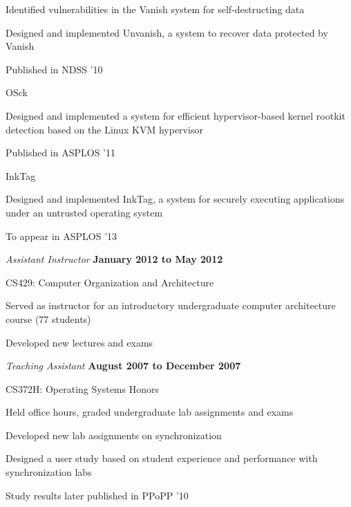 \documentclass[10pt]{article}
\newenvironment{outerlist}[1][\enskip\textbullet]%
        {\begin{itemize}[#1]}{\end{itemize}%
         \vspace{-.6\baselineskip}}
\newenvironment{innerlist}[1][\enskip\textbullet]%
        {\begin{compactitem}[#1]}{\end{compactitem}}
\begin{document}
\begin{outerlist}
\begin{innerlist}
        \begin{innerlist}
           \item Identified vulnerabilities in the Vanish system for
self-destructing data
           \item Designed and implemented Unvanish, a system to recover
data protected by Vanish
           \item Published in NDSS '10
         \end{innerlist}
         \item OSck
         \begin{innerlist}
            \item Designed and implemented a system for efficient
hypervisor-based kernel rootkit detection based on the Linux KVM hypervisor
            \item Published in ASPLOS '11
         \end{innerlist}
         \item InkTag
         \begin{innerlist}
            \item Designed and implemented InkTag, a system for securely
executing applications under an untrusted operating system
            \item To appear in ASPLOS '13
         \end{innerlist}
    \end{innerlist}
\item[] \textit{Assistant Instructor}%
        \hfill \textbf{January 2012 to May 2012}
        \begin{innerlist}
           \item CS429: Computer Organization and Architecture
           \begin{innerlist}
              \item Served as instructor for an introductory undergraduate
computer architecture course (77 students)
              \item Developed new lectures and exams
           \end{innerlist}
        \end{innerlist}
\item[] \textit{Teaching Assistant}%
        \hfill \textbf{August 2007 to December 2007}
        \begin{innerlist}
           \item CS372H: Operating Systems Honors
           \begin{innerlist}
              \item Held office hours, graded undergraduate lab assignments and exams
              \item Developed new lab assignments on synchronization
              \item Designed a user study based on student experience and
performance with synchronization labs
              \item Study results later published in PPoPP '10
           \end{innerlist}
        \end{innerlist}
\end{outerlist}
\end{document}
